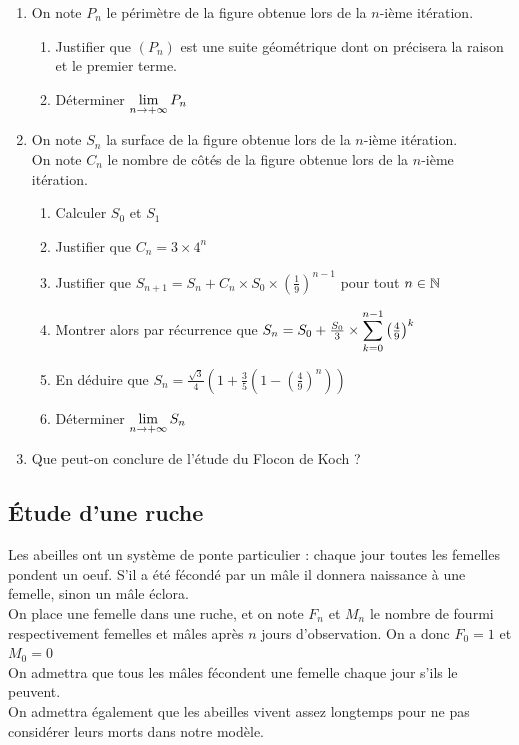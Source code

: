 \documentclass[oneside,12pt]{book}          %
\begin{document}
\begin{enumerate}
    \item On note $P_n$ le périmètre de la figure obtenue lors de la $n$-ième itération.
    \begin{enumerate}
        \item Justifier que $(P_n)$ est une suite géométrique dont on précisera la raison et le premier terme.
        \item Déterminer ${\lim\limits_{n\to +\infty}}\, P_n$
    \end{enumerate}
    \item On note $S_n$ la surface de la figure obtenue lors de la $n$-ième itération.\\
            On note $C_n$ le nombre de côtés de la figure obtenue lors de la $n$-ième itération.
    \begin{enumerate}
        \item Calculer $S_0$ et $S_1$
        \item Justifier que $C_n=3\times4^n$
        \item Justifier que $S_{n+1}=S_n+C_n\times S_0\times\left(\frac{1}{9}\right)^{n-1}$ pour tout ${n\in\mathbb N}$
        \item Montrer alors par récurrence que $S_n=S_0+\frac{S_0}{3}\times{\displaystyle\sum_{k=0}^{n-1}}\left(\frac{4}{9}\right)^k$
        \item En déduire que $S_n=\frac{\sqrt{3}}{4}\left(1+\frac{3}{5}\left(1-\left(\frac{4}{9}\right)^n\right)\right)$
        \item Déterminer ${\lim\limits_{n\to +\infty}}\, S_n$
    \end{enumerate}
    \item Que peut-on conclure de l'étude du Flocon de Koch ?
\end{enumerate}



\subsection{Étude d'une ruche}
Les abeilles ont un système de ponte particulier : chaque jour toutes les femelles pondent un oeuf. S'il a été fécondé par un mâle il donnera naissance à une femelle, sinon un mâle éclora.\\[5pt]
On place une femelle dans une ruche, et on note $F_n$ et $M_n$ le nombre de fourmi respectivement femelles et mâles après $n$ jours d'observation. On a donc $F_0=1$ et $M_0=0$\\[5pt]
On admettra que tous les mâles fécondent une femelle chaque jour s'ils le peuvent.\\
On admettra également que les abeilles vivent assez longtemps pour ne pas considérer leurs morts dans notre modèle.
\end{document}
